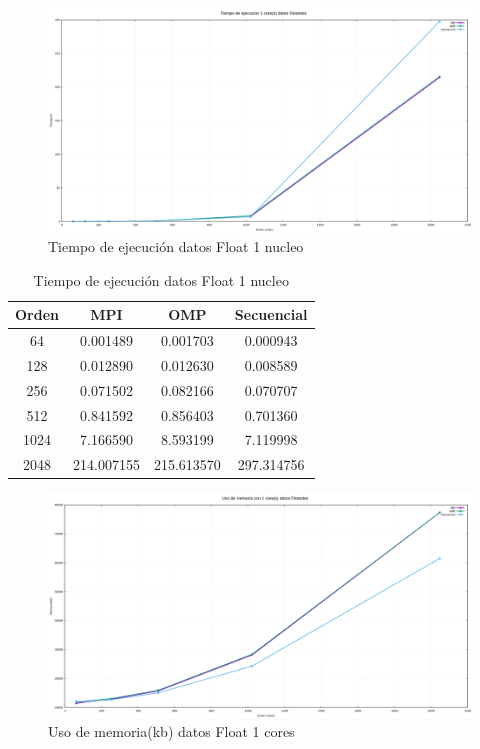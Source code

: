 \documentclass[10pt]{IEEEtran}
\begin{document}
\begin{figure}[H]
  \centering
  \includegraphics[width=0.95\linewidth]{figs/1nucleoFlotantesTiempo.png}
  \caption{Tiempo de ejecución datos Float 1 nucleo}
  \label{fig:flo}
\end{figure}

\begin{table}[H]
  \caption{Tiempo de ejecución datos Float 1 nucleo}
  \label{table_example}
  \centering
  \begin{tabular}{|c|c|c|c|}
    \hline
    \textbf{Orden} & \textbf{MPI} & \textbf{OMP} & \textbf{Secuencial} \\
    \hline
    64 & 0.001489 & 0.001703 & 0.000943 \\
    128 & 0.012890 & 0.012630 & 0.008589 \\
    256 & 0.071502 & 0.082166 & 0.070707 \\
    512 & 0.841592 & 0.856403 & 0.701360 \\
    1024 & 7.166590 & 8.593199 & 7.119998 \\
    2048 & 214.007155 & 215.613570 & 297.314756 \\
    \hline
  \end{tabular}
\end{table}

\begin{figure}[H]
  \centering
  \includegraphics[width=0.95\linewidth]{figs/1nucleoFlotantesMemoria.png}
  \caption{Uso de memoria(kb) datos Float 1 cores}
  \label{fig:flo2}
\end{figure}
\end{document}
